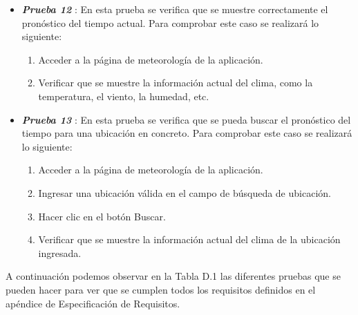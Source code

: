 \begin{itemize}
   \item \textbf{\textit{Prueba 12}} \label{Prueba12}: En esta prueba se verifica que se muestre correctamente el pronóstico del tiempo actual. Para comprobar este caso se realizará lo siguiente:

   \begin{enumerate}
       \item Acceder a la página de meteorología de la aplicación.
       \item  Verificar que se muestre la información actual del clima, como la temperatura, el viento, la humedad, etc.
   \end{enumerate}

   \item \textbf{\textit{Prueba 13}} \label{Prueba13}: En esta prueba se verifica que se pueda buscar el pronóstico del tiempo para una ubicación en concreto. Para comprobar este caso se realizará lo siguiente:

   \begin{enumerate}
       \item Acceder a la página de meteorología de la aplicación.
       \item Ingresar una ubicación válida en el campo de búsqueda de ubicación.
       \item Hacer clic en el botón Buscar.
       \item  Verificar que se muestre la información actual del clima de la ubicación ingresada.
   \end{enumerate}
   
\end{itemize}

A continuación podemos observar en la Tabla D.1 las diferentes pruebas que se pueden hacer para ver que se cumplen todos los requisitos definidos en el apéndice de Especificación de Requisitos.


